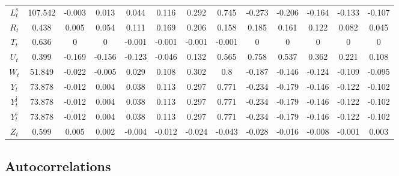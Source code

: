\begin{tabular}{c|c|c|c|c|c|c|c|c|c|c|c|c|}
$L^{\mathrm{s}}_{t}$ & 107.542 & -0.003 & 0.013 & 0.044 & 0.116 & 0.292 & 0.745 & -0.273 & -0.206 & -0.164 & -0.133 & -0.107 \\
$R_{t}$ & 0.438 & 0.005 & 0.054 & 0.111 & 0.169 & 0.206 & 0.158 & 0.185 & 0.161 & 0.122 & 0.082 & 0.045 \\
$T_{t}$ & 0.636 & 0 & 0 & -0.001 & -0.001 & -0.001 & -0.001 & 0 & 0 & 0 & 0 & 0 \\
$U_{t}$ & 0.399 & -0.169 & -0.156 & -0.123 & -0.046 & 0.132 & 0.565 & 0.758 & 0.537 & 0.362 & 0.221 & 0.108 \\
$W_{t}$ & 51.849 & -0.022 & -0.005 & 0.029 & 0.108 & 0.302 & 0.8 & -0.187 & -0.146 & -0.124 & -0.109 & -0.095 \\
$Y_{t}$ & 73.878 & -0.012 & 0.004 & 0.038 & 0.113 & 0.297 & 0.771 & -0.234 & -0.179 & -0.146 & -0.122 & -0.102 \\
$Y^{\mathrm{j}}_{t}$ & 73.878 & -0.012 & 0.004 & 0.038 & 0.113 & 0.297 & 0.771 & -0.234 & -0.179 & -0.146 & -0.122 & -0.102 \\
$Y^{\mathrm{s}}_{t}$ & 73.878 & -0.012 & 0.004 & 0.038 & 0.113 & 0.297 & 0.771 & -0.234 & -0.179 & -0.146 & -0.122 & -0.102 \\
$Z_{t}$ & 0.599 & 0.005 & 0.002 & -0.004 & -0.012 & -0.024 & -0.043 & -0.028 & -0.016 & -0.008 & -0.001 & 0.003 \\
\hline
\end{tabular}


\subsection{Autocorrelations}

